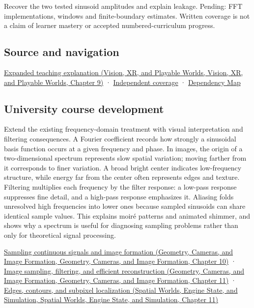 Recover the two tested sinusoid amplitudes and explain leakage. Pending: FFT implementations, windows and finite-boundary estimates. Written coverage is not a claim of learner mastery or accepted numbered-curriculum progress.

\subsection{Source and navigation}\label{appendix-b60686ba06a1-source-and-navigation}

\href{../07-Vision-XR-and-Playable-Worlds/main.pdf\#nameddest=04-visual-computing-ii-ch042-fourier-coordinates-reveal-what-a-filter-removes}{Expanded teaching explanation (Vision, XR, and Playable Worlds, Vision, XR, and Playable Worlds, Chapter 9)} · \hyperref[appendix-fd090d982a15-xr01---independent-seeing-and-representation-source]{Independent coverage} · \hyperref[appendix-4ad47bdd269a]{Dependency Map}

\subsection{University course development}\label{appendix-b60686ba06a1-university-course-development}

Extend the existing frequency-domain treatment with visual interpretation and filtering consequences. A Fourier coefficient records how strongly a sinusoidal basis function occurs at a given frequency and phase. In images, the origin of a two-dimensional spectrum represents slow spatial variation; moving farther from it corresponds to finer variation. A broad bright center indicates low-frequency structure, while energy far from the center often represents edges and texture. Filtering multiplies each frequency by the filter response: a low-pass response suppresses fine detail, and a high-pass response emphasizes it. Aliasing folds unresolved high frequencies into lower ones because sampled sinusoids can share identical sample values. This explains moiré patterns and animated shimmer, and shows why a spectrum is useful for diagnosing sampling problems rather than only for theoretical signal processing.

\href{../03-Geometry-Cameras-and-Image-Formation/main.pdf\#nameddest=03-visual-computing-i-ch003-sampling-continuous-signals-and-image-formation}{Sampling continuous signals and image formation (Geometry, Cameras, and Image Formation, Geometry, Cameras, and Image Formation, Chapter 10)} · \href{../03-Geometry-Cameras-and-Image-Formation/main.pdf\#nameddest=03-visual-computing-i-ch004-image-sampling-filtering-and-efficient-reconstruction}{Image sampling, filtering, and efficient reconstruction (Geometry, Cameras, and Image Formation, Geometry, Cameras, and Image Formation, Chapter 11)} · \href{../05-Spatial-Worlds-Engine-State-and-Simulation/main.pdf\#nameddest=04-visual-computing-ii-ch030-edges-contours-and-subpixel-localization}{Edges, contours, and subpixel localization (Spatial Worlds, Engine State, and Simulation, Spatial Worlds, Engine State, and Simulation, Chapter 11)}
